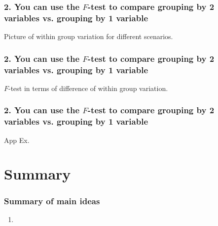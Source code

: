 \documentclass[slidestop,compress,mathserif,12pt,t,professionalfonts,xcolor=table]{beamer}
\newcommand{\mainideaA}{You can use the $F$-test to compare grouping by 2 variables vs. grouping by 1 variable}
\begin{document}

\begin{frame}
  \frametitle{2. \mainideaA}

Picture of within group variation for different scenarios.

\end{frame}


\begin{frame}
  \frametitle{2. \mainideaA}

  $F$-test in terms of difference of within group variation.

\end{frame}


\begin{frame}
  \frametitle{2. \mainideaA}

  App Ex.

\end{frame}


\section{Summary}


\begin{frame}
\frametitle{Summary of main ideas}

\vfill

\begin{enumerate}

\item {}

\end{enumerate}

\vfill

\end{frame}

\end{document}
